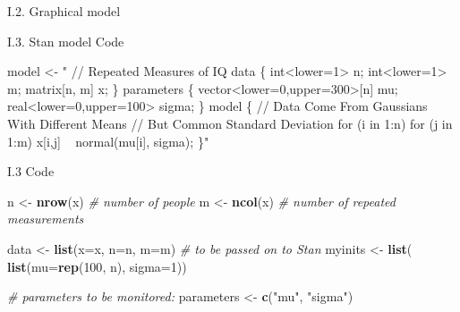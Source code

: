 \documentclass[ignorenonframetext,]{beamer}
\newenvironment{Shaded}{\begin{snugshade}}{\end{snugshade}}
\newcommand{\CommentTok}[1]{\textcolor[rgb]{0.56,0.35,0.01}{\textit{#1}}}
\newcommand{\DataTypeTok}[1]{\textcolor[rgb]{0.13,0.29,0.53}{#1}}
\newcommand{\DecValTok}[1]{\textcolor[rgb]{0.00,0.00,0.81}{#1}}
\newcommand{\KeywordTok}[1]{\textcolor[rgb]{0.13,0.29,0.53}{\textbf{#1}}}
\newcommand{\NormalTok}[1]{#1}
\newcommand{\StringTok}[1]{\textcolor[rgb]{0.31,0.60,0.02}{#1}}
\begin{document}
\begin{frame}{%
\protect\hypertarget{i.2.-graphical-model}{%
I.2. Graphical model}}

\end{frame}

\begin{frame}[fragile]{%
\protect\hypertarget{i.3.-stan-model-code}{%
I.3. Stan model Code}}

\begin{Shaded}
\begin{Highlighting}[]
\NormalTok{model <-}\StringTok{ "}
\StringTok{// Repeated Measures of IQ}
\StringTok{data \{ }
\StringTok{  int<lower=1> n;}
\StringTok{  int<lower=1> m;}
\StringTok{  matrix[n, m] x;}
\StringTok{\}}
\StringTok{parameters \{}
\StringTok{  vector<lower=0,upper=300>[n] mu;}
\StringTok{  real<lower=0,upper=100> sigma;}
\StringTok{\} }
\StringTok{model \{}
\StringTok{  // Data Come From Gaussians With Different Means}
\StringTok{  // But Common Standard Deviation}
\StringTok{  for (i in 1:n)}
\StringTok{    for (j in 1:m)  }
\StringTok{      x[i,j] ~ normal(mu[i], sigma);}
\StringTok{\}"}
\end{Highlighting}
\end{Shaded}

\end{frame}

\begin{frame}[fragile]{%
\protect\hypertarget{i.3-code}{%
I.3 Code}}

\begin{Shaded}
\begin{Highlighting}[]
\NormalTok{n <-}\StringTok{ }\KeywordTok{nrow}\NormalTok{(x) }\CommentTok{# number of people}
\NormalTok{m <-}\StringTok{ }\KeywordTok{ncol}\NormalTok{(x) }\CommentTok{# number of repeated measurements}

\NormalTok{data <-}\StringTok{ }\KeywordTok{list}\NormalTok{(}\DataTypeTok{x=}\NormalTok{x, }\DataTypeTok{n=}\NormalTok{n, }\DataTypeTok{m=}\NormalTok{m) }\CommentTok{# to be passed on to Stan}
\NormalTok{myinits <-}\StringTok{ }\KeywordTok{list}\NormalTok{(}
  \KeywordTok{list}\NormalTok{(}\DataTypeTok{mu=}\KeywordTok{rep}\NormalTok{(}\DecValTok{100}\NormalTok{, n), }\DataTypeTok{sigma=}\DecValTok{1}\NormalTok{))}

\CommentTok{# parameters to be monitored: }
\NormalTok{parameters <-}\StringTok{ }\KeywordTok{c}\NormalTok{(}\StringTok{"mu"}\NormalTok{, }\StringTok{"sigma"}\NormalTok{)}
\end{Highlighting}
\end{Shaded}

\end{frame}
\end{document}
